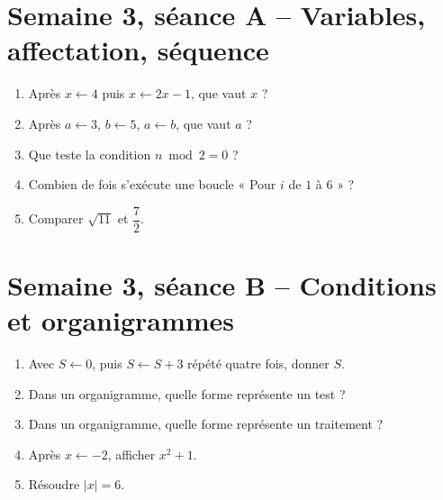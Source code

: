 \section{Semaine 3, séance A -- Variables, affectation, séquence}
\begin{enumerate}
  \item Après $x\leftarrow4$ puis $x\leftarrow2x-1$, que vaut $x$ ?
  \item Après $a\leftarrow3$, $b\leftarrow5$, $a\leftarrow b$, que vaut $a$ ?
  \item Que teste la condition $n\bmod2=0$ ?
  \item Combien de fois s'exécute une boucle « Pour $i$ de $1$ à $6$ » ?
  \item Comparer $\sqrt{11}$ et $\dfrac72$.
\end{enumerate}

\section{Semaine 3, séance B -- Conditions et organigrammes}
\begin{enumerate}
  \item Avec $S\leftarrow0$, puis $S\leftarrow S+3$ répété quatre fois, donner $S$.
  \item Dans un organigramme, quelle forme représente un test ?
  \item Dans un organigramme, quelle forme représente un traitement ?
  \item Après $x\leftarrow-2$, afficher $x^2+1$.
  \item Résoudre $|x|=6$.
\end{enumerate}

